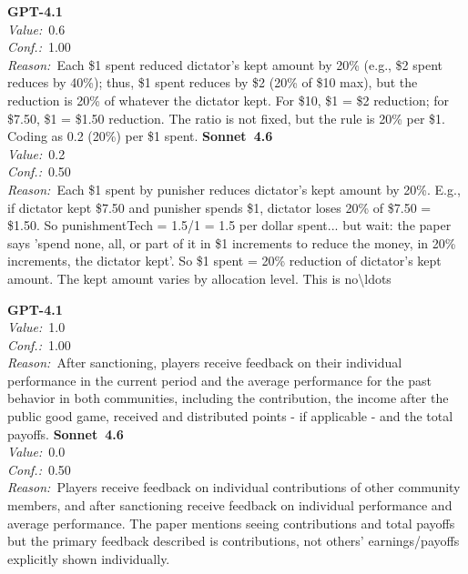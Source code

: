 \documentclass[11pt,a4paper]{article}
\begin{document}
\begin{tcolorbox}[
  title={\textbf{CONFIG\_punishmentTech} \textbar{} DOI: 10.1177\_0956797615624469 \textbar{} Cond.~0},
  colback=blue!3!white,
  colframe=blue!45!black,
  fonttitle=\small\sffamily,
  sidebyside,
  sidebyside align=top seam,
  lower separated=false,
  breakable,
  before upper={\small},
  before lower={\small},
]
\textbf{GPT-4.1}\\[2pt]
\textit{Value:}~0.6\\[3pt]
\textit{Conf.:}~1.00\\[3pt]
\textit{Reason:}~Each \$1 spent reduced dictator's kept amount by 20\% (e.g., \$2 spent reduces by 40\%); thus, \$1 spent reduces by \$2 (20\% of \$10 max), but the reduction is 20\% of whatever the dictator kept. For \$10, \$1 = \$2 reduction; for \$7.50, \$1 = \$1.50 reduction. The ratio is not fixed, but the rule is 20\% per \$1. Coding as 0.2 (20\%) per \$1 spent.
\tcblower
\textbf{Sonnet~4.6}\\[2pt]
\textit{Value:}~0.2\\[3pt]
\textit{Conf.:}~0.50\\[3pt]
\textit{Reason:}~Each \$1 spent by punisher reduces dictator's kept amount by 20\%. E.g., if dictator kept \$7.50 and punisher spends \$1, dictator loses 20\% of \$7.50 = \$1.50. So punishmentTech = 1.5/1 = 1.5 per dollar spent... but wait: the paper says 'spend none, all, or part of it in \$1 increments to reduce the money, in 20\% increments, the dictator kept'. So \$1 spent = 20\% reduction of dictator's kept amount. The kept amount varies by allocation level. This is no\textbackslash{}ldots
\end{tcolorbox}

\begin{tcolorbox}[
  title={\textbf{CONFIG\_showOtherSummaries} \textbar{} DOI: 10.1016\_j.econlet.2020.109155 \textbar{} Cond.~0},
  colback=blue!3!white,
  colframe=blue!45!black,
  fonttitle=\small\sffamily,
  sidebyside,
  sidebyside align=top seam,
  lower separated=false,
  breakable,
  before upper={\small},
  before lower={\small},
]
\textbf{GPT-4.1}\\[2pt]
\textit{Value:}~1.0\\[3pt]
\textit{Conf.:}~1.00\\[3pt]
\textit{Reason:}~After sanctioning, players receive feedback on their individual performance in the current period and the average performance for the past behavior in both communities, including the contribution, the income after the public good game, received and distributed points - if applicable - and the total payoffs.
\tcblower
\textbf{Sonnet~4.6}\\[2pt]
\textit{Value:}~0.0\\[3pt]
\textit{Conf.:}~0.50\\[3pt]
\textit{Reason:}~Players receive feedback on individual contributions of other community members, and after sanctioning receive feedback on individual performance and average performance. The paper mentions seeing contributions and total payoffs but the primary feedback described is contributions, not others' earnings/payoffs explicitly shown individually.
\end{tcolorbox}
\end{document}
